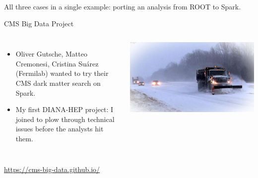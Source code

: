 \documentclass[aspectratio=169]{beamer}
\begin{document}
\begin{frame}{}
\vspace{0.5 cm}
\begin{center}
\begin{minipage}{0.8\linewidth}
\begin{center}
\Large All three cases in a single example: porting an analysis from ROOT to Spark.
\end{center}
\end{minipage}
\end{center}
\end{frame}

\begin{frame}{CMS Big Data Project}
\vspace{1 cm}
\begin{columns}
\begin{itemize}
\item Oliver Gutsche, Matteo Cremonesi, Cristina Su\'arez (Fermilab) wanted to try their CMS dark matter search on Spark.
\item My first DIANA-HEP project: I joined to plow through technical issues before the analysts hit them.
\end{itemize}

\includegraphics[width=\linewidth]{snowplow.jpg}
\end{columns}

\vspace{0.25 cm}
\begin{center}
\textcolor{blue}{\underline{\url{https://cms-big-data.github.io/}}}
\end{center}
\end{frame}
\end{document}
